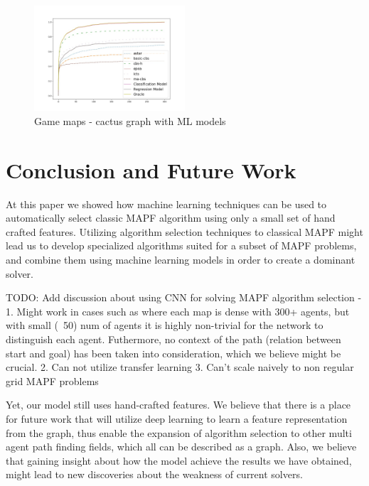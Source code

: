 \documentclass[letterpaper]{article} %
\begin{document}
\begin{figure}[h]
    \centering
    \includegraphics[width=0.5\textwidth]{images/game-cactus.jpg}
    \caption{Game maps - cactus graph with ML models}
    \label{fig:3}
\end{figure}



\section{Conclusion and Future Work}
At this paper we showed how machine learning techniques can be used to automatically select classic MAPF algorithm using only a small set of hand crafted features. Utilizing algorithm selection techniques to classical MAPF might lead us to develop specialized algorithms suited for a subset of MAPF problems, and combine them using machine learning models in order to create a dominant solver. 

TODO: Add discussion about using CNN for solving MAPF algorithm selection  - 1. Might work in cases such as \cite{sigurdson2019deep} where each map is dense with 300+ agents, but with small (~50) num of agents it is highly non-trivial for the network to distinguish each agent. Futhermore, no context of the path (relation between start and goal) has been taken into consideration, which we believe might be crucial.
2. Can not utilize transfer learning
3. Can't scale naively to non regular grid MAPF problems 

Yet, our model still uses hand-crafted features. We believe that there is a place for future work that will utilize deep learning to learn a feature representation from the graph, thus enable the expansion of algorithm selection to other multi agent path finding fields, which all can be described as a graph. Also, we believe that gaining insight about how the model achieve the results we have obtained, might lead to new discoveries about the weakness of current solvers.
\end{document}
